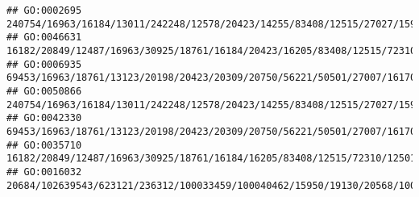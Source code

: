 \documentclass[
]{article}
\begin{document}
\begin{verbatim}
## GO:0002695                                                                                                                                                                                                                                                240754/16963/16184/13011/242248/12578/20423/14255/83408/12515/27027/15930/234199/57916/20666/100043314/208154/57757/14960/16149/14419/60533/58205/20371/12229
## GO:0046631                                                                                                                                                                                                                                                   16182/20849/12487/16963/30925/18761/16184/20423/16205/83408/12515/72310/12501/16160/12775/58185/16364/545030/110168/321019/208154/320484/60533/20371/16186
## GO:0006935                                                                                                                                                          69453/16963/18761/13123/20198/20423/20309/20750/56221/50501/27007/16170/20299/20295/76527/12554/12145/252837/12773/23832/20306/20307/20304/20303/12775/12777/16841/14165/56838/21943/110168/321019/66793/245195/19876/12458/14293/11629/16149/12766
## GO:0050866                                                                                                                                                                                                                                          240754/16963/16184/13011/242248/12578/20423/14255/83408/12515/27027/15930/234199/57916/20666/75745/100043314/208154/57757/14960/16149/14419/60533/58205/20371/12229
## GO:0042330                                                                                                                                                          69453/16963/18761/13123/20198/20423/20309/20750/56221/50501/27007/16170/20299/20295/76527/12554/12145/252837/12773/23832/20306/20307/20304/20303/12775/12777/16841/14165/56838/21943/110168/321019/66793/245195/19876/12458/14293/11629/16149/12766
## GO:0035710                                                                                                                                                                                                                                                                                     16182/20849/12487/16963/30925/18761/16184/16205/83408/12515/72310/12501/16160/12775/58185/16364/321019/60533/20371/16186
## GO:0016032                                                                                                                                                                               20684/102639543/623121/236312/100033459/100040462/15950/19130/20568/100038882/23962/231655/246728/246727/23961/23960/246730/94094/76681/434219/20128/209387/68713/69550/20307/20304/58185/12265/71223/17858/54419/224762/16149

\end{verbatim}
\end{document}
